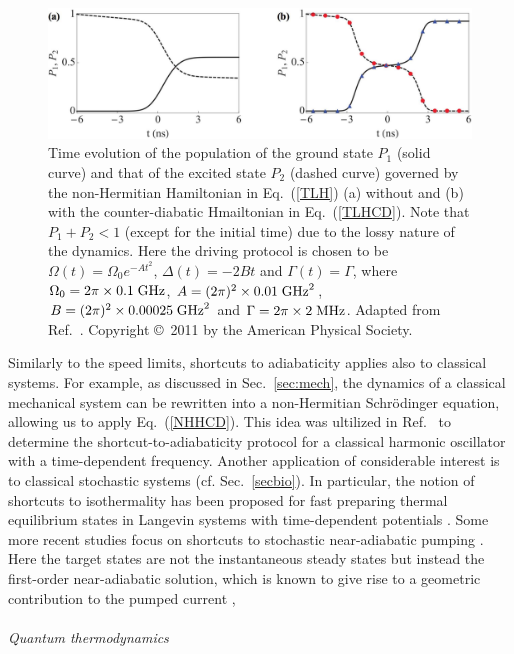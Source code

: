 \documentclass{tADP2e}
\theoremstyle{plain}
\theoremstyle{plain}
\theoremstyle{definition}
\begin{document}
\begin{figure}[!t]
\begin{center}
\includegraphics[width=14cm]{./Figures/fig_6_STA.pdf}
\end{center}
\caption{Time evolution of the population of the ground state $P_1$ (solid curve) and that of the excited state $P_2$ (dashed curve) governed by the non-Hermitian Hamiltonian in Eq.~(\ref{TLH}) (a) without and (b) with the counter-diabatic Hmailtonian in Eq.~(\ref{TLHCD}). Note that $P_1+P_2<1$ (except for the initial time) due to the lossy nature of the dynamics. Here the driving protocol is chosen to be $\Omega(t)=\Omega_0 e^{-At^2}$, $\Delta(t)=-2Bt$ and $\Gamma(t)=\Gamma$, where $\Omega_0=2\pi\times 0.1\;{\rm GHz}$, $A=(2\pi)^2\times0.01\;{\rm GHz}^2$, $B=(2\pi)^2\times 0.00025\;{\rm GHz}^2$ and $\Gamma=2\pi\times 2\;{\rm MHz}$. Adapted from Ref.~\cite{IS11}. Copyright \copyright\,  2011 by the American Physical Society.}
\label{fig:STA}
\end{figure}


Similarly to the speed limits, shortcuts to adiabaticity applies also to classical systems. For example, as discussed in Sec.~\ref{sec:mech}, the dynamics of a classical mechanical system can be rewritten into a non-Hermitian Schr\"odinger equation, allowing us to apply Eq.~(\ref{NHHCD}). This idea was ultilized in Ref.~\cite{IS11} to determine the shortcut-to-adiabaticity protocol for a classical harmonic oscillator with a time-dependent frequency. Another application of considerable interest is to classical stochastic systems (cf. Sec.~\ref{secbio}). In particular, the notion of shortcuts to isothermality has been proposed for fast preparing thermal equilibrium states in Langevin systems with time-dependent potentials \cite{LG17}. Some more recent studies focus on shortcuts to stochastic near-adiabatic pumping \cite{FK20,TK20}. Here the target states are not the instantaneous steady states but instead the first-order near-adiabatic solution, which is known to give rise to a geometric contribution to the pumped current \cite{RJ10,ST11},
\\ \\ {\it Quantum thermodynamics}
\end{document}
